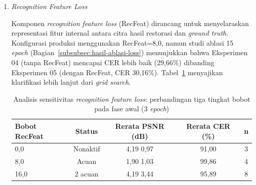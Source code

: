 \documentclass[12pt,a4paper]{article}
\begin{document}
\begin{enumerate}[leftmargin=1.5em, labelsep=0.5em, itemindent=0pt, label=\arabic*., topsep=0pt, partopsep=0pt]
\begin{enumerate}[leftmargin=1.5em, labelsep=0.5em, itemindent=0pt, topsep=0.5em, label=\alph*.]
        Hasil analisis menunjukkan bahwa variasi bobot CTC dalam rentang $\pm$50\% dari nilai acuan (0,15) tidak menghasilkan perbedaan PSNR yang signifikan (rentang 3,16--4,20 dB). Ketiga konfigurasi menghasilkan CER yang sebanding ($\sim$96\%), mengindikasikan bahwa sinyal CTC sudah memadai pada bobot 0,075 dan penggandaan hingga 0,30 tidak memberikan keuntungan tambahan. Temuan ini menjawab pertanyaan penelitian: pada rentang yang diuji, bobot CTC tidak menyebabkan degradasi kualitas visual yang berarti. Konfigurasi produksi menggunakan bobot 0,15 sebagai titik tengah yang seimbang.

        \item \textit{Recognition Feature Loss}
        
        Komponen \textit{recognition feature loss} (RecFeat) dirancang untuk menyelaraskan representasi fitur internal antara citra hasil restorasi dan \textit{ground truth}. Konfigurasi produksi menggunakan RecFeat=8,0, namun studi ablasi 15 \textit{epoch} (Bagian~\ref{subsubsec:hasil-ablasi-loss}) menunjukkan bahwa Eksperimen 04 (tanpa RecFeat) mencapai CER lebih baik (29,66\%) dibanding Eksperimen 05 (dengan RecFeat, CER 30,16\%). Tabel~\ref{tab:recfeat-sensitivity} menyajikan klarifikasi lebih lanjut dari \textit{grid search}.

        \begin{table}[!htbp]
            \caption[Sensitivitas bobot RecFeat]{Analisis sensitivitas \textit{recognition feature loss}: perbandingan tiga tingkat bobot pada fase awal (3 \textit{epoch})}
            \label{tab:recfeat-sensitivity}
            \normalsize
            \begin{tabular}{lcccc}
                \hline
                \textbf{Bobot RecFeat} & \textbf{Status}      & \textbf{Rerata PSNR (dB)} & \textbf{Rerata CER (\%)} & \textbf{n} \\
                \hline
                0,0            & Nonaktif    & 4,19 \textpm{} 0,97   & 91,00        & 3 \\
                8,0            & Acuan    & 1,90 \textpm{} 1,03   & 99,86        & 4 \\
                16,0           & 2\texttimes{} acuan & 4,19 \textpm{} 3,44   & 95,89        & 8 \\
                \hline
            \end{tabular}
        \end{table}


\end{enumerate}
\end{enumerate}
\end{document}
